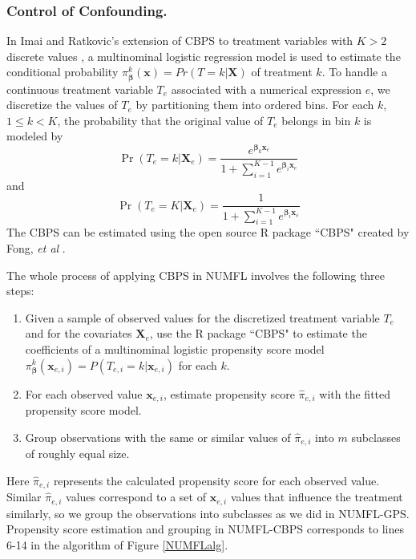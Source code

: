 \documentclass[times]{stvrauth}
\begin{document}
\subsubsection{Control of Confounding.}\label{IVB1}
In Imai and Ratkovic's extension of CBPS to treatment variables with $K>2$ discrete values \cite{Hansen1982}, a multinominal logistic regression model is used to estimate the conditional probability $\pi_{\pmb \beta}^k (\pmb{x})=Pr⁡(T=k |  \pmb{X})$ of treatment $k$. To handle a continuous treatment variable $T_e$ associated with a numerical expression $e$, we discretize the values of $T_e$ by partitioning them into ordered bins.  For each $k$, $1 \leq k<K$, the probability  that the original value of $T_e$ belongs in bin $k$ is modeled by
\begin{equation*}
\Pr ({T_e} = k|{\pmb{X}_e}) = \frac{{{e^{{{\pmb \beta} _k}{\pmb{x}_e}}}}}{{1 + \sum\nolimits_{i = 1}^{K - 1} {{e^{{{\pmb \beta} _i}{\pmb{x}_e}}}} }}
\end{equation*}
and
\begin{equation*}
\Pr ({T_e} = K|{\pmb{X}_e}) = \frac{1}{{1 + \sum\nolimits_{i = 1}^{K - 1} {{e^{{{\pmb \beta} _i}{\pmb{x}_e}}}} }}
\end{equation*}
The CBPS can be estimated using the open source R package ``CBPS" created by Fong, {\it et al} \cite{CBPS}.

The whole process of applying CBPS in NUMFL involves the following three steps:
\begin{enumerate}
\item 	Given a sample of observed values for the discretized treatment variable $T_e$ and for the covariates $\pmb{X}_e$, use the R package ``CBPS" to estimate the coefficients of a multinominal logistic propensity score model $\pi _{\pmb{\beta}} ^k({\pmb{x}_{e,i}}) = P({T_{e,i}} = k|{\pmb{x}_{e,i}})$ for each $k$.
\item	For each observed value ${\pmb x}_{e,i}$, estimate propensity score $\hat \pi _{e,i}$ with the fitted propensity score model.
\item Group observations with the same or similar values of $\hat \pi _{e,i}$ into $m$ subclasses of roughly equal size.
\end{enumerate}

Here $\hat \pi _{e,i}$ represents the calculated propensity score for each observed value.  Similar $\hat \pi _{e,i}$ values correspond to a set of $\pmb{x}_{e,i}$ values that influence the treatment similarly, so we group the observations into subclasses as we did in NUMFL-GPS.  Propensity score estimation and grouping in NUMFL-CBPS corresponds to lines 6-14 in the algorithm of Figure \ref{NUMFLalg}.
\end{document}
